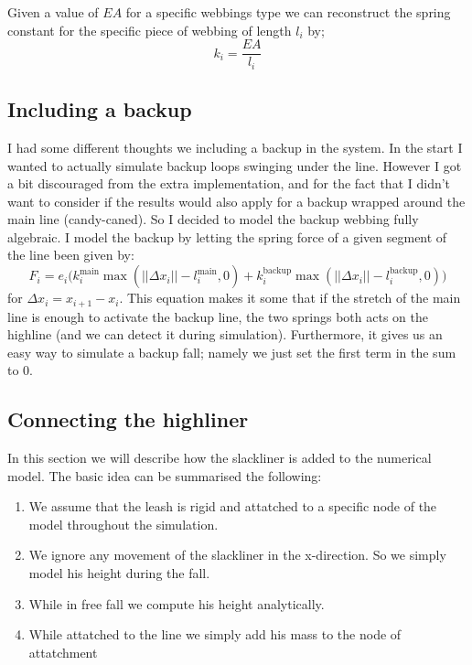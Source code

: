\documentclass[a4paper,10pt]{article}
\begin{document}
Given a value of $EA$ for a specific webbings type we can reconstruct the spring constant for the specific piece of webbing of length $l_i$ by;
%
\begin{equation}
   k_i = \frac{EA}{l_i}
\end{equation}
%

\subsection{Including a backup}
\label{sub:backup}
I had some different thoughts we including a backup in the system. In the start I wanted to actually simulate backup loops swinging under the line. However I got a bit discouraged from the extra implementation, and for the fact that I didn't want to consider if the results would also apply for a backup wrapped around the main line (candy-caned). So I decided to model the backup webbing fully algebraic.
%
I model the backup by letting the spring force of a given segment of the line been given by:
%
\begin{equation}
   F_{i} = e_{i} \big(k_i^\text{main} \max(||\Delta x_i|| - l^\text{main}_{i}, 0) 
       + k_i^\text{backup} \max(||\Delta x_i|| - l^\text{backup}_{i}, 0) \big)
\end{equation}
%
for $\Delta x_i = x_{i+1} - x_i$. This equation makes it some that if the stretch of the main line is enough to activate the backup line, the two springs both acts on the highline (and we can detect it during simulation). Furthermore, it gives us an easy way to simulate a backup fall; namely we just set the first term in the sum to 0.

\subsection{Connecting the highliner}%
\label{sub:connect}

In this section we will describe how the slackliner is added to the numerical model. The basic idea can be summarised the following: 

\begin{enumerate}[label=(\Alph*)]
   \item We assume that the leash is rigid and attatched to a specific node of the model throughout the simulation. 
   \item We ignore any movement of the slackliner in the x-direction. So we simply model his height during the fall.
   \item While in free fall we compute his height analytically.
   \item While attatched to the line we simply add his mass to the node of attatchment
\end{enumerate}
\end{document}

